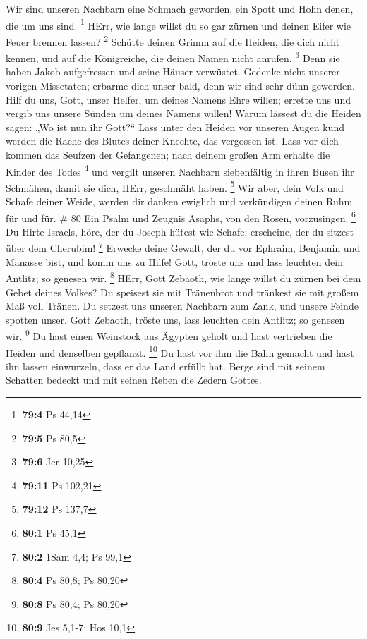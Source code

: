  Wir sind unseren Nachbarn eine Schmach geworden, ein Spott
und Hohn denen, die um uns sind. \footnote{\textbf{79:4} Ps 44,14}
 HErr, wie lange willst du so gar zürnen und deinen Eifer
wie Feuer brennen lassen? \footnote{\textbf{79:5} Ps 80,5} 
Schütte deinen Grimm auf die Heiden, die dich nicht kennen, und auf die
Königreiche, die deinen Namen nicht anrufen. \footnote{\textbf{79:6} Jer
  10,25}  Denn sie haben Jakob aufgefressen und seine Häuser
verwüstet.  Gedenke nicht unserer vorigen Missetaten;
erbarme dich unser bald, denn wir sind sehr dünn geworden. 
Hilf du uns, Gott, unser Helfer, um deines Namens Ehre willen; errette
uns und vergib uns unsere Sünden um deines Namens willen! 
Warum lässest du die Heiden sagen: „Wo ist nun ihr Gott?{}`` Lass unter
den Heiden vor unseren Augen kund werden die Rache des Blutes deiner
Knechte, das vergossen ist.  Lass vor dich kommen das
Seufzen der Gefangenen; nach deinem großen Arm erhalte die Kinder des
Todes \footnote{\textbf{79:11} Ps 102,21}  und vergilt
unseren Nachbarn siebenfältig in ihren Busen ihr Schmähen, damit sie
dich, HErr, geschmäht haben. \footnote{\textbf{79:12} Ps 137,7}
 Wir aber, dein Volk und Schafe deiner Weide, werden dir
danken ewiglich und verkündigen deinen Ruhm für und für. \# 80
 Ein Psalm und Zeugnis Asaphs, von den Rosen, vorzusingen.
\footnote{\textbf{80:1} Ps 45,1}  Du Hirte Israels, höre,
der du Joseph hütest wie Schafe; erscheine, der du sitzest über dem
Cherubim! \footnote{\textbf{80:2} 1Sam 4,4; Ps 99,1} 
Erwecke deine Gewalt, der du vor Ephraim, Benjamin und Manasse bist, und
komm uns zu Hilfe!  Gott, tröste uns und lass leuchten dein
Antlitz; so genesen wir. \footnote{\textbf{80:4} Ps 80,8; Ps 80,20}
 HErr, Gott Zebaoth, wie lange willst du zürnen bei dem
Gebet deines Volkes?  Du speisest sie mit Tränenbrot und
tränkest sie mit großem Maß voll Tränen.  Du setzest uns
unseren Nachbarn zum Zank, und unsere Feinde spotten unser. 
Gott Zebaoth, tröste uns, lass leuchten dein Antlitz; so genesen wir.
\footnote{\textbf{80:8} Ps 80,4; Ps 80,20}  Du hast einen
Weinstock aus Ägypten geholt und hast vertrieben die Heiden und
denselben gepflanzt. \footnote{\textbf{80:9} Jes 5,1-7; Hos 10,1}
 Du hast vor ihm die Bahn gemacht und hast ihn lassen
einwurzeln, dass er das Land erfüllt hat.  Berge sind mit
seinem Schatten bedeckt und mit seinen Reben die Zedern Gottes.
